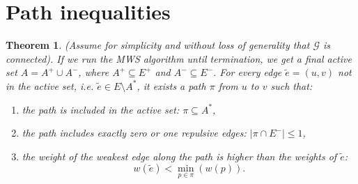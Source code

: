 \documentclass[12pt]{article}
\newtheorem{theorem}{Theorem}[section]
\begin{document}
\section{Path inequalities}
\begin{theorem}
(Assume for simplicity and without loss of generality that $\mathcal{G}$ is connected). If we run the MWS algorithm until termination, we get a final active set ${A = A^{+} \cup A^{-}}$, where $A^{+} \subseteq E^+$ and $A^{-} \subseteq E^-$. For every edge $\tilde{e}=(u,v)$ not in the active set, i.e. $\tilde{e} \in E\setminus A^*$, it exists a path $\pi$ from $u$ to $v$ such that:
\begin{enumerate}
\item the path is included in the active set: $\pi \subseteq A^*$,  \label{cond_1} 
\item the path includes exactly zero or one repulsive edges: $\left| \pi \cap E^{-}  \right| \leq 1$, \label{cond_2}
\item the weight of the weakest edge along the path is higher than the weights of $\tilde{e}$: \label{cond_3}
\[ 
w(\tilde{e}) < \min_{p\in \pi}  (w(p)).
\]
\end{enumerate} 
\end{theorem}
\end{document}
